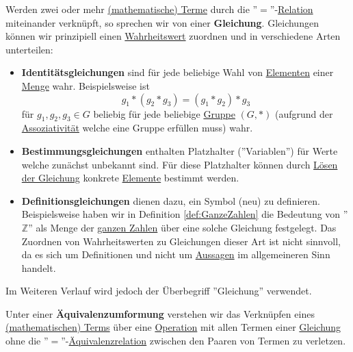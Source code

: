 \documentclass[../../main.tex]{subfiles}
\begin{document}
	\begin{definition}
		\label{def:Gleichung}
		Werden zwei oder mehr \hyperref[def:MathematischerTerm]{(mathematische) Terme} durch die ''$=$''-\hyperref[def:Relation]{Relation} miteinander verknüpft, so sprechen wir von einer \textbf{Gleichung}. Gleichungen können wir prinzipiell einen \hyperref[def:Wahrheitswert]{Wahrheitswert} zuordnen und in verschiedene Arten unterteilen:
		\begin{itemize}
			\item \textbf{Identitätsgleichungen} sind für jede beliebige Wahl von \hyperref[def:Element]{Elementen} einer \hyperref[def:Menge]{Menge} wahr. Beispielsweise ist 
			$$
			g_1 * (g_2 * g_3) = (g_1 * g_2) * g_3
			$$
			für $g_1,g_2,g_3 \in G$ beliebig für jede beliebige \hyperref[def:Gruppe]{Gruppe} $(G,*)$ (aufgrund der \hyperref[def:assoziativ]{Assoziativität} welche eine Gruppe erfüllen muss) wahr.

			\item \textbf{Bestimmungsgleichungen} enthalten Platzhalter (''Variablen'') für Werte welche zunächst unbekannt sind. Für diese Platzhalter können durch \hyperref[def:LösenEinerGleichung]{Lösen der Gleichung} konkrete \hyperref[def:Element]{Elemente} bestimmt werden.
			
			\item \textbf{Definitionsgleichungen} dienen dazu, ein Symbol (neu) zu definieren. Beispielsweise haben wir in Definition \ref{def:GanzeZahlen} die Bedeutung von ''$\mathbb{Z}$'' als Menge der \hyperref[def:GanzeZahlen]{ganzen Zahlen} über eine solche Gleichung festgelegt. Das Zuordnen von Wahrheitswerten zu Gleichungen dieser Art ist nicht sinnvoll, da es sich um Definitionen und nicht um \hyperref[def:Aussage]{Aussagen} im allgemeineren Sinn handelt.
 		\end{itemize}
 		Im Weiteren Verlauf wird jedoch der Überbegriff ''Gleichung'' verwendet. 
	\end{definition}

	\begin{definition}[Äquivalenzumformung]
		\label{def:Äquivalenzumformung}
		Unter einer \textbf{Äquivalenzumformung} verstehen wir das Verknüpfen eines \hyperref[def:MathematischerTerm]{(mathematischen) Terms} über eine \hyperref[def:Operation]{Operation} mit allen Termen einer \hyperref[def:Gleichung]{Gleichung} ohne die ''$=$''-\hyperref[def:Äquivalenzrelation]{Äquivalenzrelation} zwischen den Paaren von Termen zu verletzen.
	\end{definition}
\end{document}
